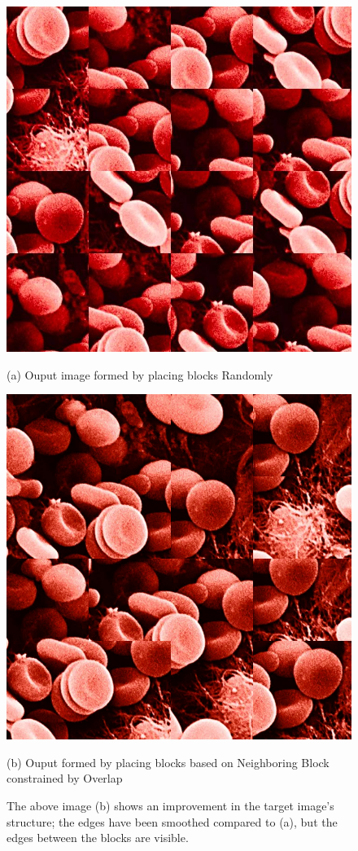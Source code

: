 \documentclass[12pt,a4paper]{report}
\begin{document}
\begin{figure}[H]

  \centering
  \includegraphics[scale=0.23]{pics/rbc_random.jpg}
  \caption*{(a) Ouput image formed by placing blocks Randomly}
  \endminipage\hspace*{0.5cm}
  \centering
  \includegraphics[scale=0.23]{pics/rbc_best.png}
    \caption*{(b) Ouput formed by placing blocks based on Neighboring Block constrained by Overlap}
  \endminipage
  \newline 
  \caption*{The above image (b) shows an improvement in the target image's structure; the edges have been smoothed compared to (a), but the edges between the blocks are visible.}
  
\end{figure}
\newpage 
\end{document}
